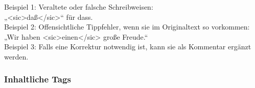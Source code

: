 \documentclass[12pt, a4paper, ngerman, bidi=default]{article}
\begin{document}
\begin{description}
    \noindent{} Beispiel 1: Veraltete oder falsche Schreibweisen: \\
    \colorbox{VeryLightGray}{„{<sic>daß</sic>}“ für dass.}\\
     Beispiel 2: Offensichtliche Tippfehler, wenn sie im Originaltext so vorkommen: \\
    \colorbox{VeryLightGray}{„Wir haben {<sic>einen</sic>} große Freude.“}\\
     Beispiel 3: Falls eine Korrektur notwendig ist, kann sie als Kommentar ergänzt werden. \\
    \end{description}

    \subsubsection{Inhaltliche Tags}
\end{document}
